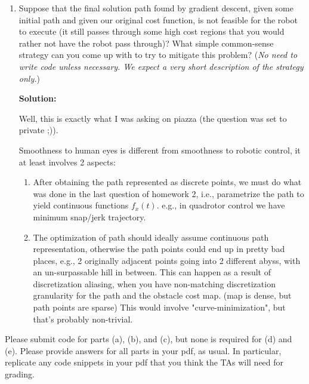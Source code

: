 \documentclass[conference,onecolumn]{IEEEtran}
\begin{document}
\begin{enumerate}
\begin{enumerate}
                        Will the final answer be the same every time? Why?

                        \textbf{Solution:}

                        Will not be the same every time because the optimization is a local optimization, and the final answer depends on the initialization.
                  \item Suppose that the final solution path found by gradient descent, given some initial path and given our original cost function, is not feasible for the robot to execute (it still passes through some high cost regions that you would rather not have the robot pass through)?
                        What simple common-sense strategy can you come up with to try to mitigate this problem?
                        (\textit{No need to write code unless necessary.
                              We expect a very short description of the strategy only.})

                        \textbf{Solution:}

                        Well, this is exactly what I was asking on piazza (the question was set to private ;)).

                        Smoothness to human eyes is different from smoothness to robotic control, it at least involves 2 aspects:
                        \begin{enumerate}
                              \item After obtaining the path represented as discrete points, we must do what was done in the last question of homework 2, i.e., parametrize the path to yield continuous functions $f_x(t)$.
                                    e.g., in quadrotor control we have minimum snap/jerk trajectory.
                              \item The optimization of path should ideally assume continuous path representation, otherwise the path points could end up in pretty bad places, e.g., 2 originally adjacent points going into 2 different abyss, with an un-surpassable hill in between.
                                    This can happen as a result of discretization aliasing, when you have non-matching discretization granularity for the path and the obstacle cost map. (map is dense, but path points are sparse)
                                    This would involve "curve-minimization", but that's probably non-trivial.
                        \end{enumerate}
            \end{enumerate}

            Please submit code for parts (a), (b), and (c), but none is required for (d) and (e).
            Please provide answers for all parts in your pdf, as usual.
            In particular, replicate any code snippets in your pdf that you think the TAs will need for grading.
\end{enumerate}
\end{document}
